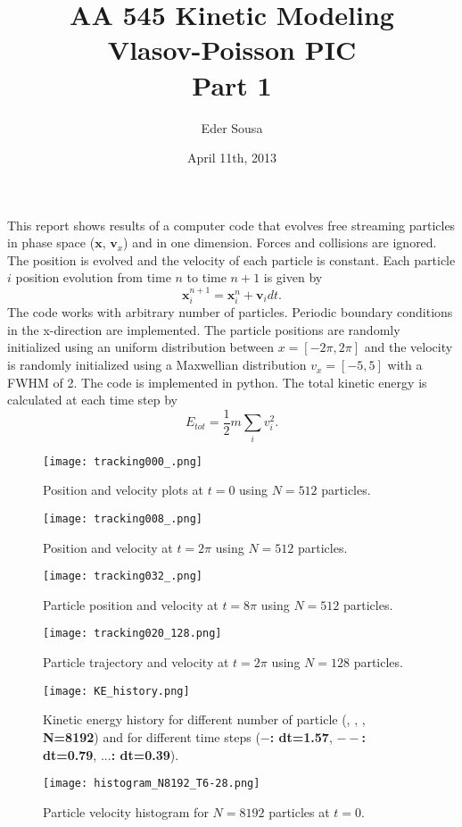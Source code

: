 \documentclass[12pt]{report}
\begin{document}
\title{AA 545 Kinetic Modeling\\ Vlasov-Poisson PIC\\ Part 1}
\author{Eder Sousa}
\date{April 11th, 2013}
\maketitle

This report shows results of a computer code that evolves free streaming particles in phase space ($\mathbf{x}$, $\mathbf{v}_x$) 
and in one dimension.
Forces and collisions are ignored. The position is evolved and the velocity of each particle is constant. Each particle $i$ position evolution from time $n$ to time $n+1$ is given by
\begin{equation}
\mathbf{x}^{n+1}_i = \mathbf{x}^n_i + \mathbf{v}_idt.
\end{equation}
The code works with arbitrary number of particles. Periodic boundary conditions in the x-direction are implemented.
The particle positions are randomly initialized using an uniform distribution between $x=[-2\pi, 2\pi]$ and the velocity is
randomly initialized using a Maxwellian distribution $v_x = [-5, 5]$ with a FWHM of 2. The code is implemented in python.
The total kinetic energy is calculated at each time step by
\begin{equation}
E_{tot} =  \frac{1}{2} m \sum_iv_i^2.
\end{equation}

\begin{figure}
\centering
\texttt{[image: tracking000\_.png]}
\caption{Position and velocity plots at $t=0$ using $N=512$ particles.}
\end{figure}

\begin{figure}
\centering
\texttt{[image: tracking008\_.png]}
\caption{Position and velocity at $t=2\pi$ using $N=512$ particles.}
\end{figure}

\begin{figure}
\centering
\texttt{[image: tracking032\_.png]}
\caption{Particle position and velocity at $t=8\pi$ using $N=512$ particles.}
\end{figure}

\begin{figure}
\centering
\texttt{[image: tracking020\_128.png]}
\caption{Particle trajectory and velocity at $t=2\pi$ using $N=128$ particles.}
\end{figure}

\begin{figure}
\centering
\texttt{[image: KE\_history.png]}
\caption{Kinetic energy history for different number of particle ({\bf{\color{blue}{N=128}}}, {\bf{\color{red}{N=512}}}, 
{\bf{\color{green}{N=2048}}}, {\bf N=8192}) and for different time steps ({\bf $-$: dt=1.57}, {\bf $--$: dt=0.79}, {\bf $...$: dt=0.39}).}
\end{figure}

\begin{figure}
\centering
\texttt{[image: histogram\_N8192\_T6-28.png]}
\caption{Particle velocity histogram for $N=8192$ particles at $t=0$.}
\end{figure}
\end{document}
